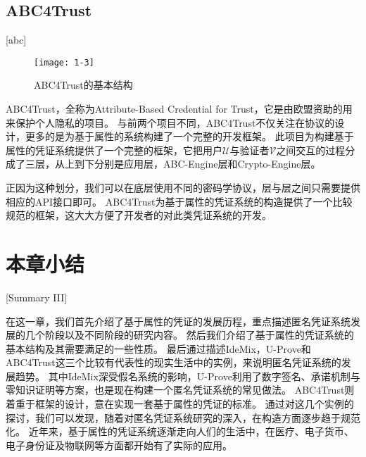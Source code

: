 \subsection{ABC4Trust}[abc]

\begin{figure}[h]
\centering
\texttt{[image: 1-3]}
\caption{ABC4Trust的基本结构}
\end{figure}

ABC4Trust，全称为Attribute-Based Credential for Trust，它是由欧盟资助的用来保护个人隐私的项目\cite{sabouri2012attribute}。
与前两个项目不同，ABC4Trust不仅关注在协议的设计，更多的是为基于属性的系统构建了一个完整的开发框架。
此项目为构建基于属性的凭证系统提供了一个完整的框架，它把用户$\mathcal{U}$与验证者$\mathcal{V}$之间交互的过程分成了三层，从上到下分别是应用层，ABC-Engine层和Crypto-Engine层。

正因为这种划分，我们可以在底层使用不同的密码学协议，层与层之间只需要提供相应的API接口即可。
ABC4Trust为基于属性的凭证系统的构造提供了一个比较规范的框架，这大大方便了开发者的对此类凭证系统的开发。

\section{本章小结}[Summary III]

在这一章，我们首先介绍了基于属性的凭证的发展历程，重点描述匿名凭证系统发展的几个阶段以及不同阶段的研究内容。
然后我们介绍了基于属性的凭证系统的基本结构及其需要满足的一些性质。
最后通过描述IdeMix，U-Prove和ABC4Trust这三个比较有代表性的现实生活中的实例，来说明匿名凭证系统的发展趋势。
其中IdeMix深受假名系统的影响，U-Prove利用了数字签名、承诺机制与零知识证明等方案，也是现在构建一个匿名凭证系统的常见做法。
ABC4Trust则着重于框架的设计，意在实现一套基于属性的凭证的标准。
通过对这几个实例的探讨，我们可以发现，随着对匿名凭证系统研究的深入，在构造方面逐步趋于规范化。
近年来，基于属性的凭证系统逐渐走向人们的生活中，在医疗、电子货币、电子身份证及物联网等方面都开始有了实际的应用\cite{neven2017privacy,viejo2019secure,de2018attribute}。